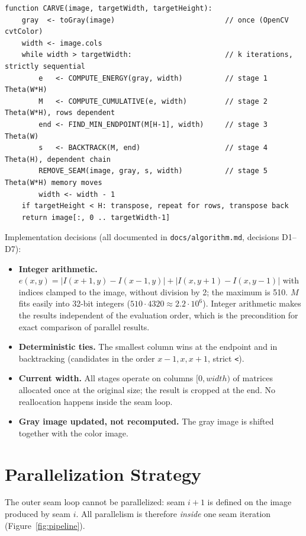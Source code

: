 \documentclass[11pt,a4paper]{article}
\begin{document}
\begin{lstlisting}
function CARVE(image, targetWidth, targetHeight):
    gray  <- toGray(image)                          // once (OpenCV cvtColor)
    width <- image.cols
    while width > targetWidth:                      // k iterations, strictly sequential
        e   <- COMPUTE_ENERGY(gray, width)          // stage 1   Theta(W*H)
        M   <- COMPUTE_CUMULATIVE(e, width)         // stage 2   Theta(W*H), rows dependent
        end <- FIND_MIN_ENDPOINT(M[H-1], width)     // stage 3   Theta(W)
        s   <- BACKTRACK(M, end)                    // stage 4   Theta(H), dependent chain
        REMOVE_SEAM(image, gray, s, width)          // stage 5   Theta(W*H) memory moves
        width <- width - 1
    if targetHeight < H: transpose, repeat for rows, transpose back
    return image[:, 0 .. targetWidth-1]
\end{lstlisting}

Implementation decisions (all documented in \texttt{docs/algorithm.md}, decisions D1--D7):
\begin{itemize}
  \item \textbf{Integer arithmetic.} $e(x,y)=|I(x+1,y)-I(x-1,y)|+|I(x,y+1)-I(x,y-1)|$ with indices clamped
    to the image, without division by 2; the maximum is 510. $M$ fits easily into 32-bit integers
    ($510\cdot4320\approx2.2\cdot10^6$). Integer arithmetic makes the results independent of the
    evaluation order, which is the precondition for exact comparison of parallel results.
  \item \textbf{Deterministic ties.} The smallest column wins at the endpoint and in backtracking
    (candidates in the order $x-1, x, x+1$, strict \texttt{<}).
  \item \textbf{Current width.} All stages operate on columns $[0,\mathit{width})$ of matrices allocated
    once at the original size; the result is cropped at the end. No reallocation happens inside the seam
    loop.
  \item \textbf{Gray image updated, not recomputed.} The gray image is shifted together with the color
    image.
\end{itemize}

\section{Parallelization Strategy}
\label{sec:strategy}

The outer seam loop cannot be parallelized: seam $i+1$ is defined on the image produced by seam $i$. All
parallelism is therefore \emph{inside} one seam iteration (Figure~\ref{fig:pipeline}).
\end{document}
